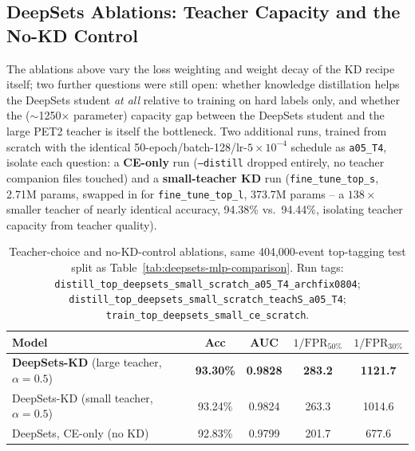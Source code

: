 \subsection{DeepSets Ablations: Teacher Capacity and the No-KD Control}
\label{sec:deepsets-teacher-ablation}

The ablations above vary the loss weighting and weight decay of the KD
recipe itself; two further questions were still open: whether knowledge
distillation helps the DeepSets student \emph{at all} relative to training
on hard labels only, and whether the ($\sim$1250$\times$ parameter) capacity
gap between the DeepSets student and the large PET2 teacher is itself the
bottleneck. Two additional runs, trained from scratch with the identical
50-epoch/batch-128/lr-$5\times10^{-4}$ schedule as \texttt{a05\_T4}, isolate
each question: a \textbf{CE-only} run (\texttt{--distill} dropped entirely,
no teacher companion files touched) and a \textbf{small-teacher KD} run
(\texttt{fine\_tune\_top\_s}, 2.71M params, swapped in for
\texttt{fine\_tune\_top\_l}, 373.7M params -- a $138\times$ smaller teacher of
nearly identical accuracy, 94.38\% vs.\ 94.44\%, isolating teacher capacity
from teacher quality).

\begin{table}[h]
    \centering
    \small
    \begin{tabular}{lcccc}
        \toprule
        Model & Acc & AUC & $1/\mathrm{FPR}_{50\%}$ & $1/\mathrm{FPR}_{30\%}$ \\
        \midrule
        \textbf{DeepSets-KD} (large teacher, $\alpha{=}0.5$) & \textbf{93.30\%} & \textbf{0.9828} & \textbf{283.2} & \textbf{1121.7} \\
        DeepSets-KD (small teacher, $\alpha{=}0.5$)          & 93.24\% & 0.9824 & 263.3 & 1014.6 \\
        DeepSets, CE-only (no KD)                             & 92.83\% & 0.9799 & 201.7 & 677.6 \\
        \bottomrule
    \end{tabular}
    \caption{Teacher-choice and no-KD-control ablations, same 404{,}000-event
    top-tagging test split as Table~\ref{tab:deepsets-mlp-comparison}. Run
    tags: \texttt{distill\_top\_deepsets\_small\_scratch\_a05\_T4\_archfix0804};
    \texttt{distill\_top\_deepsets\_small\_scratch\_teachS\_a05\_T4};
    \texttt{train\_top\_deepsets\_small\_ce\_scratch}.}
    \label{tab:deepsets-teacher-ablation}
\end{table}

